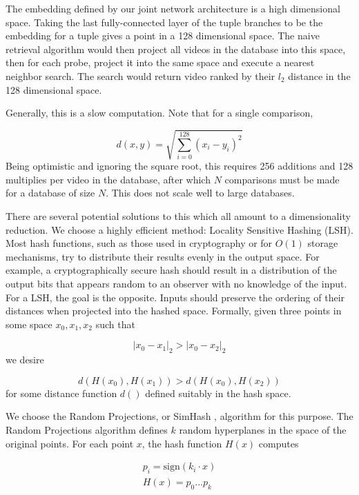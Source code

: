The embedding defined by our joint network architecture is a high dimensional space. Taking the last fully-connected layer of the tuple branches to be the embedding for a tuple gives a point in a 128 dimensional space. The naive retrieval algorithm would then project all videos in the database into this space, then for each probe, project it into the same space and execute a nearest neighbor search. The search would return video ranked by their $l_2$ distance in the 128 dimensional space.

Generally, this is a slow computation. Note that for a single comparison, 

\begin{equation}
    d(x, y) = \sqrt{\sum_{i=0}^{128} (x_i - y_i)^2}
\end{equation} 
Being optimistic and ignoring the square root, this requires 256 additions and 128 multiplies per video in the database, after which $N$ comparisons must be made for a database of size $N$. This does not scale well to large databases.

There are several potential solutions to this which all amount to a dimensionality reduction. We choose a highly efficient method: Locality Sensitive Hashing (LSH). Most hash functions, such as those used in cryptography or for $O(1)$ storage mechanisms, try to distribute their results evenly in the output space. For example, a cryptographically secure hash should result in a distribution of the output bits that appears random to an observer with no knowledge of the input. For a LSH, the goal is the opposite. Inputs should preserve the ordering of their distances when projected into the hashed space. Formally, given three points in some space $x_0, x_1, x_2$ such that 

\begin{equation}
|x_0 - x_1|_2 > |x_0 - x_2|_2
\end{equation}
we desire

\begin{equation}
d(H(x_0), H(x_1)) > d(H(x_0), H(x_2))
\end{equation}
for some distance function $d()$ defined suitably in the hash space.

We choose the Random Projections, or SimHash \cite{charikar2002similarity}, algorithm for this purpose. The Random Projections algorithm defines $k$ random hyperplanes in the space of the original points. For each point $x$, the hash function $H(x)$ computes

\begin{align}
    p_i = \text{sign}(k_i \cdot x) \\
    H(x) = p_0...p_k
\end{align}

